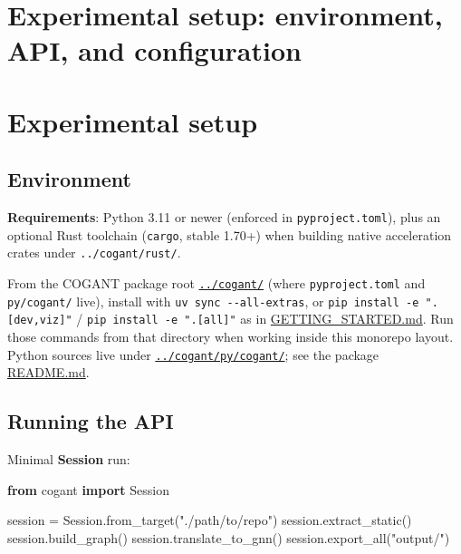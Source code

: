 \documentclass[
]{article}
\newenvironment{Shaded}{}{}
\newcommand{\ImportTok}[1]{\textcolor[rgb]{0.00,0.50,0.00}{\textbf{#1}}}
\newcommand{\NormalTok}[1]{#1}
\newcommand{\OperatorTok}[1]{\textcolor[rgb]{0.40,0.40,0.40}{#1}}
\newcommand{\StringTok}[1]{\textcolor[rgb]{0.25,0.44,0.63}{#1}}
\begin{document}
\newpage

\section{Experimental setup: environment, API, and
configuration}\label{experimental-setup-environment-api-and-configuration}

\section{Experimental setup}\label{experimental-setup}

\subsection{Environment}\label{environment}

\textbf{Requirements}: Python 3.11 or newer (enforced in
\texttt{pyproject.toml}), plus an optional Rust toolchain
(\texttt{cargo}, stable 1.70+) when building native acceleration crates
under \texttt{../cogant/rust/}.

From the COGANT package root \href{../cogant/}{\texttt{../cogant/}}
(where \texttt{pyproject.toml} and \texttt{py/cogant/} live), install
with \texttt{uv\ sync\ -\/-all-extras}, or
\texttt{pip\ install\ -e\ ".{[}dev,viz{]}"} /
\texttt{pip\ install\ -e\ ".{[}all{]}"} as in
\href{../cogant/GETTING_STARTED.md}{GETTING\_STARTED.md}. Run those
commands from that directory when working inside this monorepo layout.
Python sources live under
\href{../cogant/py/cogant/}{\texttt{../cogant/py/cogant/}}; see the
package \href{../cogant/README.md}{README.md}.

\subsection{Running the API}\label{running-the-api}

Minimal \textbf{Session} run:

\begin{Shaded}
\begin{Highlighting}[]
\ImportTok{from}\NormalTok{ cogant }\ImportTok{import}\NormalTok{ Session}

\NormalTok{session }\OperatorTok{=}\NormalTok{ Session.from\_target(}\StringTok{"./path/to/repo"}\NormalTok{)}
\NormalTok{session.extract\_static()}
\NormalTok{session.build\_graph()}
\NormalTok{session.translate\_to\_gnn()}
\NormalTok{session.export\_all(}\StringTok{"output/"}\NormalTok{)}
\end{Highlighting}
\end{Shaded}
\end{document}
